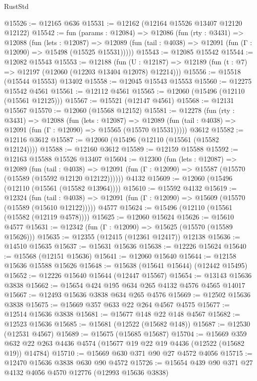 \begin{lexlean}{RustStd}
\begin{coremodule}
@15526 := @12165 @636
@15531 := @12162 (@12164 @15526 @13407 @12120 @12122)
@15542 := fun (params : @12084) =>
  @12086
    (fun (rty : @3431) =>
    @12088
      (fun (lets : @12087) =>
      @12089 (fun (tail : @4038) => @12091 (fun (Γ : @12090) => @15498 (@15525 @15531)))))
@15543 := @12085 @15542
@15544 := @12082 @15543
@15553 := @12188
    (fun (U : @12187) => @12189 (fun (t : @7) => @12197 (@12060 (@12203 @13404 @12078) @12214)))
@15556 := @15518 (@15544 @15553) @13402
@15558 := @12045 @15543 @15553
@15560 := @12275 @15542 @4561
@15561 := @12112 @4561
@15565 := @12060 (@15496 (@12110 (@15561 @12125)))
@15567 := @15521 (@12147 @4561)
@15568 := @12131 @15567
@15570 := @12060 (@15568 @12152)
@15581 := @12278
    (fun (rty : @3431) =>
    @12088
      (fun (lets : @12087) =>
      @12089 (fun (tail : @4038) => @12091 (fun (Γ : @12090) => @15565 (@15570 @15531)))))
    @3612
@15582 := @12116 @3612
@15587 := @12060 (@15496 (@12110 (@15561 (@15582 @12124))))
@15588 := @12160 @3612
@15589 := @12159 @15588
@15592 := @12163 @15588 @15526 @13407
@15604 := @12300
    (fun (lets : @12087) =>
    @12089
      (fun (tail : @4038) =>
      @12091 (fun (Γ : @12090) => @15587 (@15570 (@15589 (@15592 @12120 @12122))))))
    @4132
@15609 := @12060 (@15496 (@12110 (@15561 (@15582 @13964))))
@15610 := @15592 @4132
@15619 := @12324
    (fun (tail : @4038) => @12091 (fun (Γ : @12090) => @15609 (@15570 (@15589 (@15610 @12122)))))
    @4577
@15624 := @15496 (@12110 (@15561 (@15582 (@12119 @4578))))
@15625 := @12060 @15624
@15626 := @15610 @4577
@15631 := @12342 (fun (Γ : @12090) => @15625 (@15570 (@15589 @15626)))
@15635 := @12355 (@12415 (@12361 @12417)) @12138
@15636 := @14510 @15635
@15637 := @15631 @15636
@15638 := @12226 @15624
@15640 := @15568 (@12151 @15636)
@15641 := @12060 @15640
@15644 := @12158 @15636 @15588 @15626
@15648 := @15638 (@15641 @15644) (@12442 @15495)
@15652 := @12226 @15640 @15644 (@12447 @15567)
@15654 := @13143 @15636 @3838
@15662 := @15654 @424 @195 @634 @265 @4132 @4576 @4565 @14017
@15667 := @12493 @15636 @3838 @634 @265 @4576
@15669 := @12502 @15636 @3838
@15675 := @15669 @357 @633 @22 @264 @4567 @4575
@15677 := @12514 @15636 @3838
@15681 := @15677 @148 @22 @148 @4567
@15682 := @12523 @15636
@15685 := @15681 (@12522 (@15682 @148))
@15687 := @12530 (@12531 @4567)
@15689 := @15675 (@15685 @15687)
@15704 := @15669
    @359
    @632
    @22
    @263
    @4436
    @4574
    (@15677 @19 @22 @19 @4436 (@12522 (@15682 @19)) @14784)
@15710 := @15669 @630 @371 @90 @27 @4572 @4056
@15715 := @12470 @15636 @3838 @630 @90 @4572
@15726 := @15654 @439 @90 @371 @27 @4132 @4056 @4570 @12776 (@12993 @15636 @3838)

\end{coremodule}
\end{lexlean}

